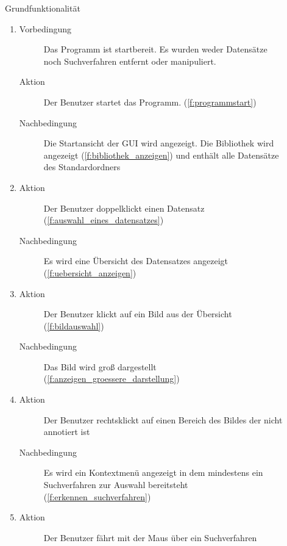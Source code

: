 \begin{description} %
	\item[] Grundfunktionalität %
	\begin{enumerate}
		\item
		\begin{description}
			\item[Vorbedingung] Das Programm ist startbereit. Es wurden weder Datensätze noch Suchverfahren entfernt oder manipuliert.
			\item[Aktion] Der Benutzer startet das Programm. (\ref{f:programmstart})
			\item[Nachbedingung] Die Startansicht der GUI wird angezeigt. Die Bibliothek wird angezeigt (\ref{f:bibliothek_anzeigen}) und enthält alle Datensätze des Standardordners
		\end{description}
		\item
		\begin{description}
			\item[Aktion] Der Benutzer doppelklickt einen Datensatz (\ref{f:auswahl_eines_datensatzes})
			\item[Nachbedingung] Es wird eine Übersicht des Datensatzes angezeigt (\ref{f:uebersicht_anzeigen})
		\end{description}
		\item
		\begin{description}
			\item[Aktion] Der Benutzer klickt auf ein Bild aus der Übersicht (\ref{f:bildauswahl})
			\item[Nachbedingung] Das Bild wird groß dargestellt (\ref{f:anzeigen_groessere_darstellung})
		\end{description}
		\item
		\begin{description}
			\item[Aktion] Der Benutzer rechtsklickt auf einen Bereich des Bildes der nicht annotiert ist
			\item[Nachbedingung] Es wird ein Kontextmenü angezeigt in dem mindestens ein Suchverfahren zur Auswahl bereitsteht (\ref{f:erkennen_suchverfahren})
		\end{description}
		\item
		\begin{description}
			\item[Aktion] Der Benutzer fährt mit der Maus über ein Suchverfahren

\end{description}
\end{enumerate}
\end{description}
